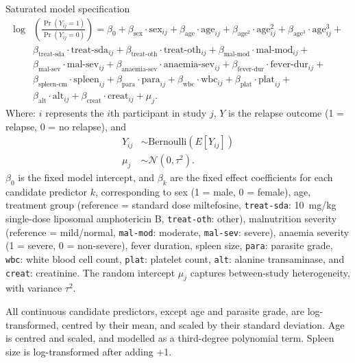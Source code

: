 \begin{mybox}[floatplacement=tb, label=box:mod-spec]{Saturated model specification}
  \begin{align*}
    \log & \left(\frac{\Pr(Y_{ij} =1)}{\Pr(Y_{ij}=0)}\right) = \beta_0 +
    \beta_{\text{sex}}\cdot\text{sex}_{ij} +
    \beta_{\text{age}}\cdot\text{age}_{ij} +
    \beta_{\text{age}^{2}}\cdot\text{age}_{ij}^2 +
    \beta_{\text{age}^{3}}\cdot\text{age}_{ij}^3 +                       \\
         & \beta_{\text{treat-sda}}\cdot\text{treat-sda}_{ij} +
    \beta_{\text{treat-oth}}\cdot\text{treat-oth}_{ij} +
    \beta_{\text{mal-mod}}\cdot\text{mal-mod}_{ij} +                     \\
         & \beta_{\text{mal-sev}}\cdot\text{mal-sev}_{ij} +
    \beta_{\text{anaemia-sev}}\cdot\text{anaemia-sev}_{ij} +
    \beta_{\text{fever-dur}}\cdot\text{fever-dur}_{ij} +                 \\
         & \beta_{\text{spleen-cm}}\cdot\text{spleen}_{ij} +
    \beta_{\text{para}}\cdot\text{para}_{ij} +
    \beta_{\text{wbc}}\cdot\text{wbc}_{ij} +
    \beta_{\text{plat}}\cdot\text{plat}_{ij} +                           \\
         & \beta_{\text{alt}}\cdot\text{alt}_{ij} +
    \beta_{\text{creat}}\cdot\text{creat}_{ij} + \mu_j.
  \end{align*}
  \tcbline
  Where: $i$ represents the $i$th participant in study $j$, $Y$ is the relapse outcome (1 = relapse, 0 = no relapse), and
  \begin{align*}
    Y_{ij} & \sim \text{Bernoulli}(E[Y_{ij}]) \\
    \mu_j  & \sim \mathcal{N}(0, \tau^2).
  \end{align*}
  $\beta_0$ is the fixed model intercept, and $\beta_{k}$ are the fixed effect coefficients for each candidate predictor $k$, corresponding to sex (1 = male, 0 = female), age, treatment group (reference = standard dose miltefosine, \texttt{treat-sda}: 10~mg/kg single-dose liposomal amphotericin B, \texttt{treat-oth}: other), malnutrition severity (reference = mild/normal, \texttt{mal-mod}: moderate, \texttt{mal-sev}: severe), anaemia severity (1 = severe, 0 = non-severe), fever duration, spleen size, \texttt{para}: parasite grade, \texttt{wbc}: white blood cell count, \texttt{plat}: platelet count, \texttt{alt}: alanine transaminase, and \texttt{creat}: creatinine. The random intercept $\mu_j$ captures between-study heterogeneity, with variance $\tau^2$.

  \vspace{0.7em}

  All continuous candidate predictors, except age and parasite grade, are log-transformed, centred by their mean, and scaled by their standard deviation. Age is centred and scaled, and modelled as a third-degree polynomial term. Spleen size is log-transformed after adding +1.
\end{mybox}

